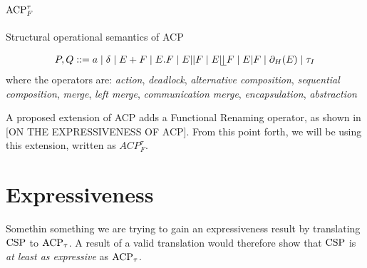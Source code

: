 \documentclass[../hons_project.tex]{subfiles}
\begin{document}
\section{\texorpdfstring{$\mathrm{ACP}_{F}^{\tau}$}{ACP-tf}}


\begin{table}[htb]
\begin{center}
\end{center}
\caption{Structural operational semantics of ACP}
\label{table:ACP}
\end{table}

\begin{align*}
   P, Q ::= a \mid \delta \mid E + F \mid E . F \mid E \merge F \mid E \leftmerge F \mid E | F \mid \restrict(E) \mid \tau_{I}
\end{align*}
where the operators are: \textit{action}, \textit{deadlock}, \textit{alternative composition}, \textit{sequential composition}, \textit{merge}, \textit{left merge}, \textit{communication merge}, \textit{encapsulation}, \textit{abstraction}

A proposed extension of ACP adds a Functional Renaming operator, as shown in [ON THE EXPRESSIVENESS OF ACP]. From this point forth, we will be using this extension, written as $ACP^{\tau}_{F}$. 


\section{Expressiveness}
Somethin something we are trying to gain an expressiveness result by translating $\mathrm{CSP}$ to $\mathrm{ACP}_{\tau}$. A result of a valid translation would therefore show that $\mathrm{CSP}$ is \textit{at least as expressive} as $\mathrm{ACP}_{\tau}$.
\end{document}
